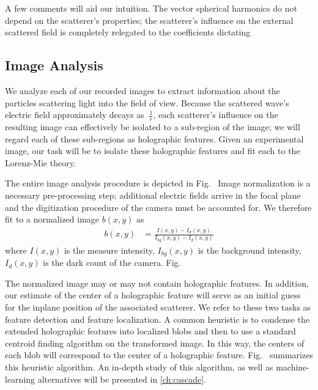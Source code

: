 A few comments will aid our intuition. The vector spherical harmonics
do not depend on the scatterer's properties; the scatterer's influence
on the external scattered field is completely relegated to the coefficients
dictating 


\subsection{Image Analysis}

We analyze each of our recorded images to extract information about the particles
scattering light into the field of view.  Because the scattered wave's electric
field approximately decays as $~\frac{1}{r}$, each scatterer's influence on the
resulting image can effectively be isolated to a sub-region of the image; we will
regard each of these sub-regions as holographic features.  Given an experimental
image, our task will be to isolate these holographic features and fit each
to the Lorenz-Mie theory.

The entire image analysis procedure is depicted in Fig.~%
Image normalization is a necessary pre-processing step; additional
electric fields arrive in the focal plane and the digitization procedure
of the camera must be accounted for. We therefore fit to a normalized
image $b(x,y)$ as
\begin{align}
  b(x,y) &= \frac{ I(x,y) - I_d(x,y)}{ I_{bg}(x,y) - I_d(x,y)} 
\end{align}
where $I(x,y)$ is the measure intensity,
$I_{bg}(x,y)$ is the background intensity,
$I_d(x,y)$ is the dark count of the camera.
Fig.~%

The normalized image may or may not contain holographic features. In addition,
our estimate of the center of a holographic feature will serve as an initial guess
for the inplane position of the associated scatterer. We refer to these two tasks as
feature detection and feature localization. A common heuristic is to condense the
extended holographic features into localized blobs and then to use a standard
centroid finding algorithm on the transformed image. In this way, the centers
of each blob will correspond to the center of a holographic feature. Fig.~%
summarizes this heuristic algorithm. An in-depth study of this algorithm, as well
as machine-learning alternatives will be presented in \autoref{ch:cascade}.

